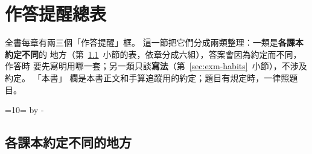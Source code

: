 \section{作答提醒總表}
\label{sec:exm-table}

全書每章有兩三個「作答提醒」框。 這一節把它們分成兩類整理：一類是\textbf{各課本約定不同}的
地方（第~\ref{sec:exm-conv}~小節的表，依章分成六組），答案會因為約定而不同，作答時
要先寫明用哪一套；另一類只談\textbf{寫法}（第~\ref{sec:exm-habits}~小節），不涉及約定。 「本書」
欄是本書正文和手算追蹤用的約定；題目有規定時，一律照題目。

\par{}
\begingroup{}=10\baselineskip {}=\pagegoal \advance{} by -\pagetotal
\ifdim\dimen0>\dimen2 \ifdim\dimen2>0pt \vfil\fi \break\fi\endgroup
\subsection{各課本約定不同的地方}
\label{sec:exm-conv}

